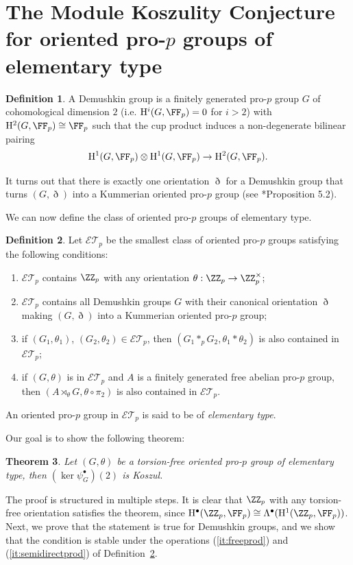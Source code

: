 \documentclass{amsart}
\newtheorem{thm}{Theorem}[section]
\theoremstyle{definition}
\newtheorem{defn}[thm]{Definition}
\theoremstyle{remark}
\newcommand{\rmH}{\mathrm{H}}
\numberwithin{equation}{section}
\begin{document}
\section{The Module Koszulity Conjecture for oriented pro-\texorpdfstring{$p$}{} groups of elementary type}
\label{sec:ModuleKoszulityForElementaryType}

\begin{defn}
    A Demushkin group is a finitely generated pro-$p$ group $G$ of cohomological dimension $2$ (i.e. $\rmH^i(G,\FF_p)=0$ for $i>2$) with $\rmH^2(G,\FF_p)\cong \FF_p$ such that the cup product induces a non-degenerate bilinear pairing
    \begin{align*}
        \rmH^1(G,\FF_p)\otimes \rmH^1(G,\FF_p)\to \rmH^2(G,\FF_p).
    \end{align*}
\end{defn}
It turns out that there is exactly one orientation $\eth$ for a Demushkin group that turns $(G,\eth)$ into a Kummerian oriented pro-$p$ group (see \cite{QuadrelliWeigel2020}*{Proposition 5.2}).

We can now define the class of oriented pro-$p$ groups of elementary type.
\begin{defn}
    \label{def:ElementaryType}
    Let $\mathcal{ET}_p$ be the smallest class of oriented pro-$p$ groups satisfying the following conditions:
    \begin{enumerate}
        \item $\mathcal{ET}_p$ contains $\ZZ_p$ with any orientation $\theta:\ZZ_p\to \ZZ_p^\times$;
        \item $\mathcal{ET}_p$ contains all Demushkin groups $G$ with their canonical orientation $\eth$ making $(G,\eth)$ into a Kummerian oriented pro-$p$ group;
        \item \label{it:freeprod} if $(G_1,\theta_1)$, $(G_2,\theta_2)\in \mathcal{ET}_p$, then $(G_1*_pG_2,\theta_1*\theta_2)$ is also contained in $\mathcal{ET}_p$;
        \item \label{it:semidirectprod} if $(G,\theta)$ is in $\mathcal{ET}_p$ and $A$ is a finitely generated free abelian pro-$p$ group, then $(A\rtimes_\theta G,\theta\circ \pi_2)$ is also contained in $\mathcal{ET}_p$.
    \end{enumerate}
    An oriented pro-$p$ group in $\mathcal{ET}_p$ is said to be of \emph{elementary type}.
\end{defn}
Our goal is to show the following theorem:
\begin{thm}
    \label{thm:ElementaryTypeKoszul}
    Let $(G,\theta)$ be a torsion-free oriented pro-$p$ group of elementary type, then $(\ker \psi_G^\bullet)(2)$ is Koszul.
\end{thm}
The proof is structured in multiple steps. It is clear that $\ZZ_p$ with any torsion-free orientation satisfies the theorem, since $\rmH^\bullet(\ZZ_p,\FF_p)\cong \Lambda^\bullet(\rmH^1(\ZZ_p,\FF_p))$. Next, we prove that the statement is true for Demushkin groups, and we show that the condition is stable under the operations (\ref{it:freeprod}) and (\ref{it:semidirectprod}) of Definition~\ref{def:ElementaryType}. 
\end{document}
